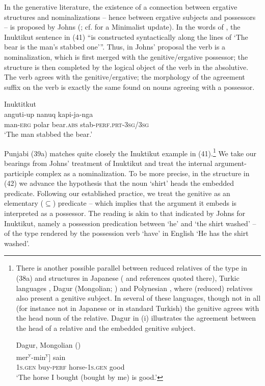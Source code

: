 \documentclass[output=paper]{langsci/langscibook}
\begin{document}
In the generative literature, the existence of a connection between ergative structures and nominalizations – hence between ergative subjects and possessors – is proposed by Johns (\citeyear{Johns1992}; cf. \citealt{Yuan2013} for a Minimalist update). In the words of \citet[61]{Johns1992}, the Inuktikut sentence in (41) “is constructed syntactically along the lines of ‘The bear is the man’s stabbed one’”. Thus, in Johns’ proposal the verb is a nominalization, which is first merged with the genitive\slash ergative possessor; the structure is then completed by the logical object of the verb in the absolutive. The verb agrees with the genitive\slash ergative; the morphology of the agreement suffix on the verb is exactly the same found on nouns agreeing with a possessor.

\ea%
         Inuktitkut \citep[61]{Johns1992}\label{ex:manzini:41}\\
    \gll anguti-up   nanuq     kapi-ja-nga\\
         man-\textsc{erg}   {polar bear.\textsc{abs}}  stab-\textsc{perf.prt-3sg/3sg}\\
    \glt ‘The man stabbed the bear.’
\z

Punjabi (39a) matches quite closely the Inuktikut example in (41).\footnote{There is another possible parallel between reduced relatives of the type in (38a) and structures in Japanese (\citealt{Miyagawa2011} and references quoted there), Turkic languages \citep{Kornfilt2008}, Dagur (Mongolian; \citealt{Hale2002}) and Polynesian \citep{Herd2011}, where (reduced) relatives also present a genitive subject. In several of these languages, though not in all (for instance not in Japanese or in standard Turkish) the genitive agrees with the head noun of the relative. Dagur in (i) illustrates the agreement between the head of a relative and the embedded genitive subject.

\ea         Dagur, Mongolian (\citealt[109-110]{Hale2002})\\
    \gll    [[mini   au-sen]         
            mer\textsuperscript{y}{}-min\textsuperscript{y}]   sain\\   \textsc{1s.gen}  buy-\textsc{perf}  horse-\textsc{1s.gen}  good\\
    \glt    ‘The horse I bought (bought by me) is good.’
\z
}  We take our bearings from Johns’ treatment of Inuktikut and treat the internal argument-participle complex as a nominalization. To be more precise, in the structure in (42) we advance the hypothesis that the noun ‘shirt’ heads the embedded predicate. Following our established practice, we treat the genitive as an elementary ($\subseteq$) predicate – which implies that the argument it embeds is interpreted as a possessor. The reading is akin to that indicated by Johns for Inuktikut, namely a possession predication between ‘he’ and ‘the shirt washed’ – of the type rendered by the possession verb ‘have’ in English ‘He has the shirt washed’.  
\end{document}
